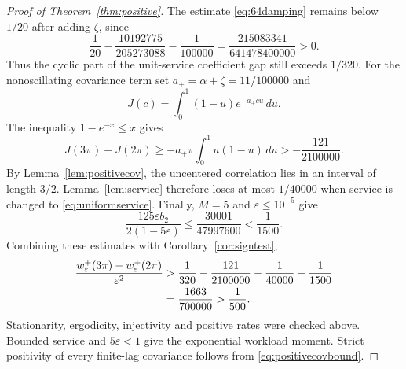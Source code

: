 \documentclass[10pt,a4paper]{amsart}
\numberwithin{equation}{section}
\newcommand{\1}{\mathbf 1}
\newcommand{\eps}{\varepsilon}
\begin{document}
\begin{proof}[Proof of Theorem~\ref{thm:positive}]
The estimate \eqref{eq:64damping} remains below $1/20$ after adding $\zeta$, since
\[
 \frac1{20}-\frac{10192775}{205273088}-\frac1{100000}
 =\frac{215083341}{641478400000}>0.
\]
Thus the cyclic part of the unit-service coefficient gap still exceeds $1/320$. For the nonoscillating covariance term set $a_+=\alpha+\zeta=11/100000$ and
\[
 J(c)=\int_0^1(1-u)e^{-a_+cu}\,du.
\]
The inequality $1-e^{-x}\le x$ gives
\[
 J(3\pi)-J(2\pi)\ge-a_+\pi\int_0^1u(1-u)\,du
 >-\frac{121}{2100000}.
\]
By Lemma~\ref{lem:positivecov}, the uncentered correlation lies in an interval of length $3/2$. Lemma~\ref{lem:service} therefore loses at most $1/40000$ when service is changed to \eqref{eq:uniformservice}. Finally, $M=5$ and $\eps\le10^{-5}$ give
\[
 \frac{125\eps b_2}{2(1-5\eps)}
 \le\frac{30001}{47997600}<\frac1{1500}.
\]
Combining these estimates with Corollary~\ref{cor:signtest},
\begin{align}\label{eq:positivemargin}
 \frac{w^+_\eps(3\pi)-w^+_\eps(2\pi)}{\eps^2}
 &>\frac1{320}-\frac{121}{2100000}-\frac1{40000}-\frac1{1500}\notag\\
 &=\frac{1663}{700000}>\frac1{500}.
\end{align}
Stationarity, ergodicity, injectivity and positive rates were checked above. Bounded service and $5\eps<1$ give the exponential workload moment. Strict positivity of every finite-lag covariance follows from \eqref{eq:positivecovbound}.
\end{proof}
\end{document}
